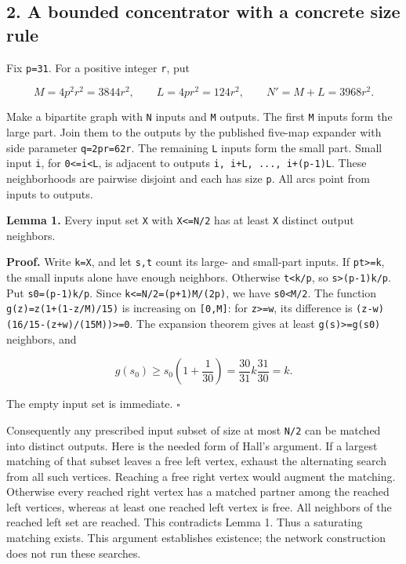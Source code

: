 \hypertarget{af-a1dc8f9b11-a-bounded-concentrator-with-a-concrete-size-rule}{%
\subsection{2. A bounded concentrator with a concrete size rule}\label{af-a1dc8f9b11-a-bounded-concentrator-with-a-concrete-size-rule}}

Fix \texttt{p=31}. For a positive integer \texttt{r}, put

\[
M=4p^2r^2=3844r^2,\qquad
L=4pr^2=124r^2,\qquad
N'=M+L=3968r^2.
\]

Make a bipartite graph with \texttt{N\textquotesingle{}} inputs and \texttt{M} outputs. The first \texttt{M} inputs form the large part. Join them to the outputs by the published five-map expander with side parameter \texttt{q=2pr=62r}. The remaining \texttt{L} inputs form the small part. Small input \texttt{i}, for \texttt{0\textless{}=i\textless{}L}, is adjacent to outputs \texttt{i,\ i+L,\ ...,\ i+(p-1)L}. These neighborhoods are pairwise disjoint and each has size \texttt{p}. All arcs point from inputs to outputs.

\textbf{Lemma 1.} Every input set \texttt{X} with \texttt{\textbar{}X\textbar{}\textless{}=N\textquotesingle{}/2} has at least \texttt{\textbar{}X\textbar{}} distinct output neighbors.

\textbf{Proof.} Write \texttt{k=\textbar{}X\textbar{}}, and let \texttt{s,t} count its large- and small-part inputs. If \texttt{pt\textgreater{}=k}, the small inputs alone have enough neighbors. Otherwise \texttt{t\textless{}k/p}, so \texttt{s\textgreater{}(p-1)k/p}. Put \texttt{s0=(p-1)k/p}. Since \texttt{k\textless{}=N\textquotesingle{}/2=(p+1)M/(2p)}, we have \texttt{s0\textless{}M/2}. The function \texttt{g(z)=z(1+(1-z/M)/15)} is increasing on \texttt{{[}0,M{]}}: for \texttt{z\textgreater{}=w}, its difference is \texttt{(z-w)(16/15-(z+w)/(15M))\textgreater{}=0}. The expansion theorem gives at least \texttt{g(s)\textgreater{}=g(s0)} neighbors, and

\[
g(s_0)\ge s_0\left(1+\frac1{30}\right)
 =\frac{30}{31}k\frac{31}{30}=k.
\]

The empty input set is immediate. \hfill\(\square\)

Consequently any prescribed input subset of size at most \texttt{N\textquotesingle{}/2} can be matched into distinct outputs. Here is the needed form of Hall's argument. If a largest matching of that subset leaves a free left vertex, exhaust the alternating search from all such vertices. Reaching a free right vertex would augment the matching. Otherwise every reached right vertex has a matched partner among the reached left vertices, whereas at least one reached left vertex is free. All neighbors of the reached left set are reached. This contradicts Lemma 1. Thus a saturating matching exists. This argument establishes existence; the network construction does not run these searches.

